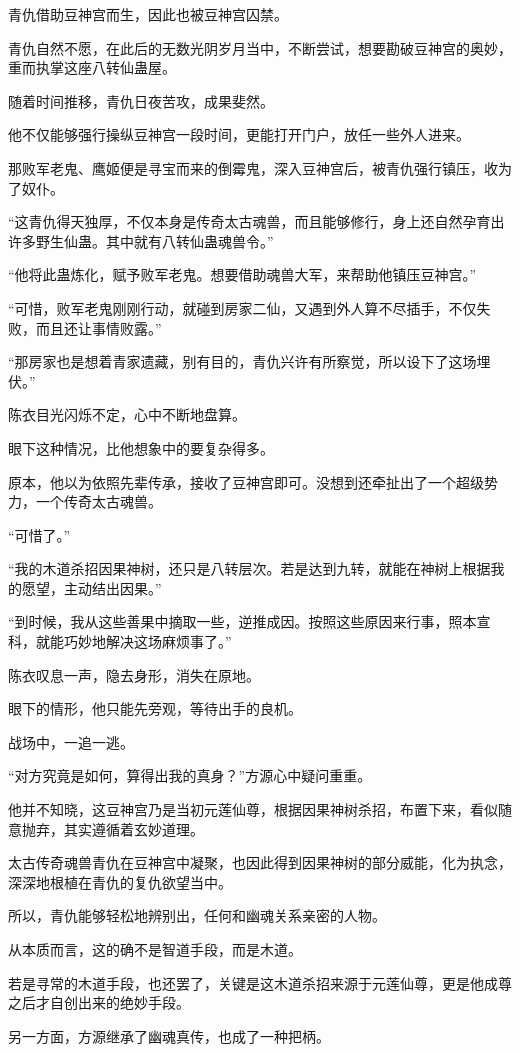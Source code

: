 \begin{this_body}
青仇借助豆神宫而生，因此也被豆神宫囚禁。

青仇自然不愿，在此后的无数光阴岁月当中，不断尝试，想要勘破豆神宫的奥妙，重而执掌这座八转仙蛊屋。

随着时间推移，青仇日夜苦攻，成果斐然。

他不仅能够强行操纵豆神宫一段时间，更能打开门户，放任一些外人进来。

那败军老鬼、鹰姬便是寻宝而来的倒霉鬼，深入豆神宫后，被青仇强行镇压，收为了奴仆。

“这青仇得天独厚，不仅本身是传奇太古魂兽，而且能够修行，身上还自然孕育出许多野生仙蛊。其中就有八转仙蛊魂兽令。”

“他将此蛊炼化，赋予败军老鬼。想要借助魂兽大军，来帮助他镇压豆神宫。”

“可惜，败军老鬼刚刚行动，就碰到房家二仙，又遇到外人算不尽插手，不仅失败，而且还让事情败露。”

“那房家也是想着青家遗藏，别有目的，青仇兴许有所察觉，所以设下了这场埋伏。”

陈衣目光闪烁不定，心中不断地盘算。

眼下这种情况，比他想象中的要复杂得多。

原本，他以为依照先辈传承，接收了豆神宫即可。没想到还牵扯出了一个超级势力，一个传奇太古魂兽。

“可惜了。”

“我的木道杀招因果神树，还只是八转层次。若是达到九转，就能在神树上根据我的愿望，主动结出因果。”

“到时候，我从这些善果中摘取一些，逆推成因。按照这些原因来行事，照本宣科，就能巧妙地解决这场麻烦事了。”

陈衣叹息一声，隐去身形，消失在原地。

眼下的情形，他只能先旁观，等待出手的良机。

战场中，一追一逃。

“对方究竟是如何，算得出我的真身？”方源心中疑问重重。

他并不知晓，这豆神宫乃是当初元莲仙尊，根据因果神树杀招，布置下来，看似随意抛弃，其实遵循着玄妙道理。

太古传奇魂兽青仇在豆神宫中凝聚，也因此得到因果神树的部分威能，化为执念，深深地根植在青仇的复仇欲望当中。

所以，青仇能够轻松地辨别出，任何和幽魂关系亲密的人物。

从本质而言，这的确不是智道手段，而是木道。

若是寻常的木道手段，也还罢了，关键是这木道杀招来源于元莲仙尊，更是他成尊之后才自创出来的绝妙手段。

另一方面，方源继承了幽魂真传，也成了一种把柄。


\end{this_body}
